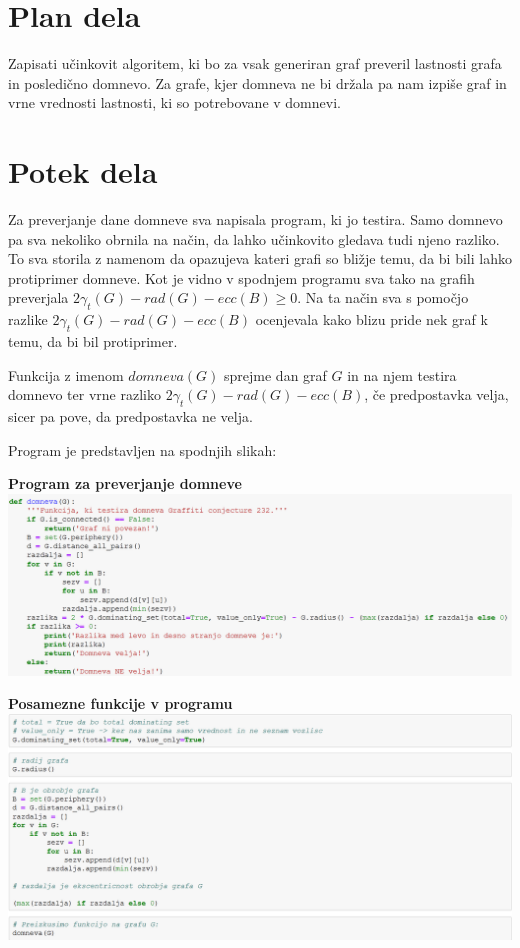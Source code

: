\documentclass[10pt, a4paper]{article}
\begin{document}
\section{Plan dela}
Zapisati učinkovit algoritem, ki bo za vsak generiran graf preveril lastnosti grafa in posledično domnevo. Za grafe, kjer  domneva ne bi držala pa nam izpiše graf in vrne vrednosti lastnosti, ki so potrebovane v domnevi.

\section{Potek dela}

Za preverjanje dane domneve sva napisala program, ki jo testira. Samo domnevo pa sva nekoliko obrnila na način, da lahko učinkovito gledava tudi njeno razliko. To sva storila z namenom da opazujeva kateri grafi so bližje temu, da bi bili lahko protiprimer domneve. Kot je vidno v spodnjem programu sva tako na grafih preverjala $2\gamma_{t}(G) - rad(G) - ecc(B) \geq 0$. Na ta način sva s pomočjo razlike $2\gamma_{t}(G) - rad(G) - ecc(B)$ ocenjevala kako blizu pride nek graf k temu, da bi bil protiprimer.

Funkcija z imenom $domneva(G)$ sprejme dan graf $G$ in na njem testira domnevo ter vrne razliko $2\gamma_{t}(G) - rad(G) - ecc(B)$, če predpostavka velja, sicer pa pove, da predpostavka ne velja.

Program je predstavljen na spodnjih slikah:

\begin{center}
\textbf{Program za preverjanje domneve}
\includegraphics[width=16cm]{domneva}
\end{center}

\begin{center}
\textbf{Posamezne funkcije v programu}
\includegraphics[width=16cm]{deli_programa}
\end{center}
\end{document}

